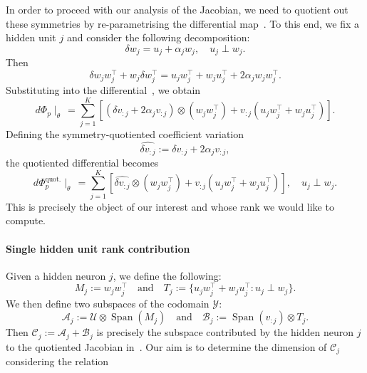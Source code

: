 In order to proceed with our analysis of the Jacobian, we need to quotient out these symmetries by re-parametrising the differential map~.
To this end, we fix a hidden unit $j$ and consider the following decomposition:
\begin{equation}
    \delta w_{j} = u_{j} + \alpha_{j} w_{j}, \quad u_{j} \perp w_{j}.
\end{equation}
Then
\begin{equation*}
    \delta w_{j} w_{j}^{\top} + w_{j} \delta w_{j}^{\top} = u_{j} w_{j}^{\top} + w_{j}u_{j}^{\top} + 2 \alpha_{j} w_{j} w_{j}^{\top}.
\end{equation*}
Substituting into the differential~, we obtain
\begin{equation*}
    d \Phi_{p}\mid_{\theta} \, = \sum_{j=1}^{K} \left[ \left( \delta v_{:j} + 2 \alpha_{j} v_{:j}\right) \otimes (w_{j}w_{j}^{\top}) + v_{:j}\left( u_{j} w_{j}^{\top} + w_{j} u_{j}^{\top} \right) \right].
\end{equation*}
Defining the symmetry-quotiented coefficient variation
\begin{equation}
    \widehat{\delta v_{:j}}:= \delta v_{:j} + 2 \alpha_{j} v_{:j},
\end{equation}
the quotiented differential becomes
\begin{equation}\label{eq: quot differential map}
    d \Phi_{p}^{\operatorname{quot.}}\mid_{\theta} \, = \sum_{j=1}^{K} \left[ \widehat{\delta v_{:j}} \otimes (w_{j}w_{j}^{\top}) + v_{:j}\left( u_{j} w_{j}^{\top} + w_{j} u_{j}^{\top} \right) \right], \quad u_{j} \perp w_{j}.
\end{equation}
This is precisely the object of our interest and whose rank we would like to compute.

\paragraph{Single hidden unit rank contribution}

Given a hidden neuron $j$, we define the following:
\begin{equation}
    M_{j}:= w_{j} w_{j}^{\top} \quad \textrm{and} \quad T_{j}:= \{u_{j}w_{j}^{\top} + w_{j}u_{j}^{\top}: u_{j} \perp w_{j}\}.
\end{equation}
We then define two subspaces of the codomain $\mathcal{Y}$:
\begin{equation}
    \mathcal{A}_{j}:= \mathcal{U} \otimes \operatorname{Span}(M_{j}) \quad \textrm{and} \quad \mathcal{B}_{j}:= \operatorname{Span}(v_{:j}) \otimes T_{j}.
\end{equation}
Then $\mathcal{C}_{j}:= \mathcal{A}_{j} + \mathcal{B}_{j}$ is precisely the subspace contributed by the hidden neuron $j$ to the quotiented Jacobian in~.
Our aim is to determine the dimension of $\mathcal{C}_{j}$ considering the relation

